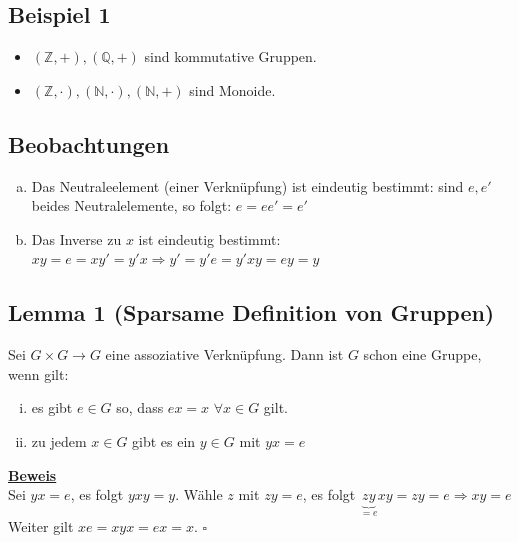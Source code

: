\documentclass[a4paper, pagesize=pdftex, pdftex, twoside, headsepline, index=totoc,toc=listof, fontsize=10pt, cleardoublepage=empty, headinclude, DIV=13, BCOR=13mm]{scrartcl}
\newcommand{\bet}[1]{\uline{\textbf{#1}}} %
\begin{document}
\subsection{Beispiel 1}
\label{sub:beispiel_1}
\begin{itemize}
	\item $(\mathds{Z}, +), (\mathds{Q}, +)$ sind kommutative Gruppen.
	\item $(\mathds{Z},\cdot), (\mathds{N},\cdot), (\mathds{N}, +)$ sind Monoide.
\end{itemize}

\subsection{Beobachtungen}
\label{sub: beobachtungen}
\begin{enumerate}[a)]
	\item Das Neutraleelement (einer Verknüpfung) ist eindeutig bestimmt: sind $e,e'$ beides Neutralelemente, so folgt: $e=ee'=e'$
	\item Das Inverse zu $x$ ist eindeutig bestimmt:\\
	$xy=e=xy'=y'x \Rightarrow y'=y'e=y'xy=ey=y$
\end{enumerate}

\subsection{Lemma 1 (Sparsame Definition von Gruppen)}
\label{sub:lemma_1}
Sei $G \times G \to G$ eine assoziative Verknüpfung. Dann ist $G$ schon eine Gruppe, wenn gilt:
\begin{enumerate}[(i)]
	\item es gibt $e \in G$ so, dass $ex=x$ $\forall x \in G$ gilt.
	\item zu jedem $x\in G$ gibt es ein $y \in G$ mit $ yx=e$
\end{enumerate}
\bet{Beweis}\\
Sei $yx=e$, es folgt $yxy=y$. Wähle $z$ mit $zy=e$, es folgt $\underbrace{zy}_{=e}xy=zy=e \Rightarrow xy=e$\\
Weiter gilt $xe=xyx=ex=x$.
\hfill $\square$
\end{document}
